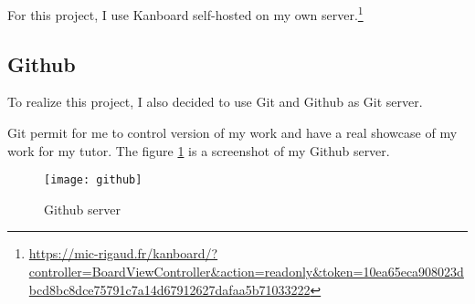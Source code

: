 For this project, I use Kanboard\cite{guillot:kanboard} self-hosted on my own server.\footnote{\url{https://mic-rigaud.fr/kanboard/?controller=BoardViewController&action=readonly&token=10ea65eca908023dbcd8bc8dce75791c7a14d67912627dafaa5b71033222}}


\subsection{Github}

To realize this project, I also decided to use Git and Github as Git server. ~\\


Git permit for me to control version of my work and have a real showcase of my
work for my tutor. The figure \ref{fig:github} is a screenshot of my Github
server.

\begin{figure}[h]
  \centering
  \texttt{[image: github]}
  \caption{Github server}
  \label{fig:github}
\end{figure}




